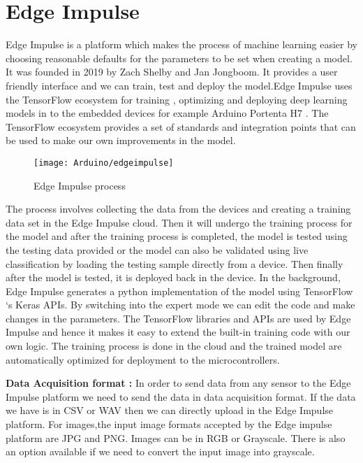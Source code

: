 %
%


\section{Edge Impulse}

Edge Impulse is a platform which makes the process of machine learning easier by choosing reasonable defaults  for the parameters to be set when creating a model. It was founded in 2019 by Zach Shelby and Jan Jongboom. It provides a user friendly interface and we can train, test and deploy the model.Edge Impulse uses the TensorFlow ecosystem for training , optimizing and deploying deep learning models in to the embedded devices for example Arduino Portenta H7 \cite{EdgeImpulsedocs:2021}. The TensorFlow ecosystem provides a set of standards and integration points that can be used to make our own improvements in the model.

\begin{figure}[H]
	\centering
	\texttt{[image: Arduino/edgeimpulse]}
	\caption{Edge Impulse process \cite{EdgeImpulse:2021}}
	\label{figure 9.2.1}
\end{figure}


The process involves collecting  the data from the devices and creating a training data set in the Edge Impulse cloud. Then it will undergo the training process for the model and after the training process is completed, the model is tested using the testing data provided or the model can also be validated using live classification by loading the testing sample directly from a device. Then finally after the model is tested, it is deployed back in the device. 
In the background, Edge Impulse generates a python implementation of the model using TensorFlow ‘s Keras APIs. By switching into the expert mode we can edit the code and make changes in the parameters. The TensorFlow libraries and APIs are used by Edge Impulse and hence it makes it easy to extend the built-in training code with our own logic. The training process is done in the cloud and the trained model are automatically optimized for deployment to the microcontrollers.

\textbf{Data Acquisition format :}
In order to send data from any sensor to the Edge Impulse platform we need to send the data in data acquisition format. If the data we have is in CSV or WAV then we can directly upload in the Edge Impulse platform. For images,the input image formats accepted by the Edge impulse platform are JPG and PNG. Images can be in RGB or Grayscale. There is also an option available if we need to convert the input image into grayscale. 

